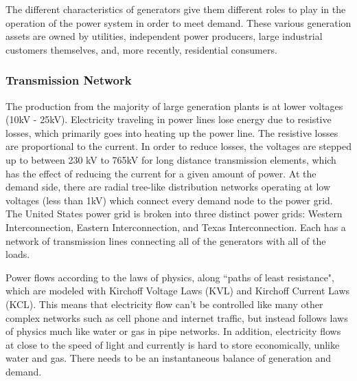 	The different characteristics of generators give them different roles to play in the operation of the power system in order to meet demand.  These various generation assets are owned by utilities, independent power producers, large industrial customers themselves, and, more recently, residential consumers.  

\subsubsection{Transmission Network}
	The production from the majority of large generation plants is at lower voltages (10kV - 25kV).  Electricity traveling in power lines lose energy due to resistive losses, which primarily goes into heating up the power line.  The resistive losses are proportional to the current.  In order to reduce losses, the voltages are stepped up to between 230 kV to 765kV for long distance transmission elements, which has the effect of reducing the current for a given amount of power.  At the demand side, there are radial tree-like distribution networks operating at low voltages (less than 1kV) which connect every demand node to the power grid.  The United States power grid is broken into three distinct power grids: Western Interconnection, Eastern Interconnection, and Texas Interconnection. Each has a network of transmission lines connecting all of the generators with all of the loads.  

	Power flows according to the laws of physics, along ``paths of least resistance", which are modeled with Kirchoff Voltage Laws (KVL) and Kirchoff Current Laws (KCL).  This means that electricity flow can't be controlled like many other complex networks such as cell phone and internet traffic, but instead follows laws of physics much like water or gas in pipe networks.  In addition, electricity flows at close to the speed of light and currently is hard to store economically, unlike water and gas.   There needs to be an instantaneous balance of generation and demand.  

